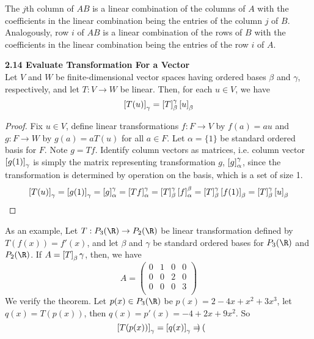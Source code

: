 \documentclass[11pt]{article}
\begin{document}
\begin{corollary*}
    The $j$th column of $AB$ is a linear combination of the columns of $A$ with the coefficients in the linear combination being the entries of the column $j$ of $B$. Analogously, row $i$ of $AB$ is a linear combination of the rows of $B$ with the coefficients in the linear combination being the entries of the row $i$ of $A$.
\end{corollary*}

\begin{theorem*}
    \textbf{2.14 Evaluate Transformation For a Vector} \\
    Let $V$ and $W$ be finite-dimensional vector spaces having ordered bases $\beta$ and $\gamma$, respectively, and let $T:V\to W$ be linear. Then, for each $u\in V$, we have 
    \[
        \left[ T(u) \right]_{\gamma} = \left[ T \right]_{\beta}^{\gamma} \left[ u \right]_{\beta}
    \]
    \begin{proof}
        Fix $u\in V$, define linear transformations $f:F\to V$ by $f(a)=au$ and $g:F\to W$ by $g(a)=aT(u)$ for all $a\in F$. Let $\alpha=\{1\}$ be standard ordered basis for $F$. Note $g = Tf$. Identify column vectors as matrices, i.e. column vector $\left[ g(1) \right]_{\gamma}$ is simply the matrix representing transformation $g$, $\left[ g \right]_{\alpha}^{\gamma}$, since the transformation is determined by operation on the basis, which is a set of size 1. 
        \[
            \left[ T(u) \right]_{\gamma} = \left[ g(1) \right]_{\gamma}
            = \left[ g \right]_{\alpha}^{\gamma} = \left[ Tf \right]_{\alpha}^{\gamma}
            = \left[ T \right]_{\beta}^{\gamma} \left[ f \right]_{\alpha}^{\beta} 
            = \left[ T \right]_{\beta}^{\gamma} \left[ f(1) \right]_{\beta}
            = \left[ T \right]_{\beta}^{\gamma} \left[ u \right]_{\beta}
        \]
    \end{proof}
    As an example, Let $T:P_3(\R) \to P_2(\R)$ be linear transformation defined by $T(f(x)) = f'(x)$, and let $\beta$ and $\gamma$ be standard ordered bases for $P_3(\R)$ and $P_2(\R)$. If $A=\left[ T \right]_{\beta}{\gamma}$, then, we have 
    \[
        A = 
        \begin{pmatrix}
            0 & 1 & 0 & 0 \\
            0 & 0 & 2 & 0 \\
            0 & 0 & 0 & 3 \\ 
        \end{pmatrix}    
    \]
    We verify the theorem. Let $p(x)\in P_3(\R)$ be $p(x) = 2-4x+x^2+3x^3$, let $q(x) = T(p(x))$, then $q(x) = p'(x) = -4 + 2x + 9x^2$. So 
    \[
        \left[ T(p(x)) \right]_{\gamma} = \left[ q(x) \right]_{\gamma} = 
        \begin{pmatrix}

\end{pmatrix}\]
\end{theorem*}
\end{document}
